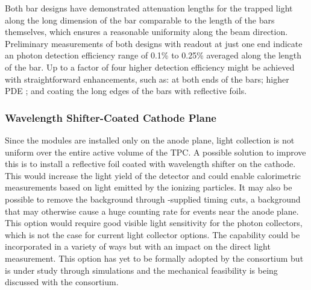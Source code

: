 Both bar designs have demonstrated attenuation lengths for the  trapped light along the long dimension of the bar comparable to the length of the bars themselves, which ensures a reasonable uniformity along the beam direction. Preliminary measurements of both designs with readout at just one end indicate an photon detection efficiency range of  \num{0.1}\% to \num{0.25}\% averaged along the length of the bar. 
Up to a factor of four higher detection efficiency might be achieved with straightforward enhancements, such as:   at both ends of the bars; higher PDE ; and coating the long edges of the bars with reflective foils. 

\subsubsection{Wavelength Shifter-Coated Cathode Plane} 
Since the  modules are installed only on the anode plane, light collection is not uniform over the entire active volume of the TPC. A possible solution to improve this is to install a reflective foil coated with wavelength shifter on the cathode.
This would increase the light yield of the detector and could enable calorimetric measurements based on light emitted by the ionizing particles. It may also be possible to remove the  background through -supplied timing cuts, a background that may otherwise cause a huge counting rate for events near the anode plane. This option would require good visible light sensitivity for the photon collectors, which is not the case for current light collector options. The capability could be incorporated in a variety of ways but with an impact on the direct light measurement. This option has yet to be formally adopted by the  consortium but is under study through  simulations and the mechanical feasibility is being discussed with the  consortium.

